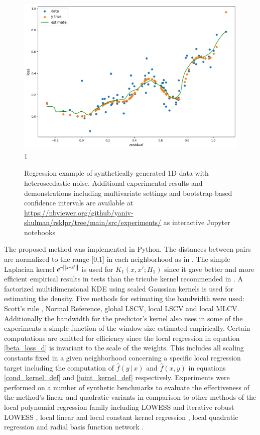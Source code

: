 \documentclass[preprint,1p,times]{elsarticle}
\begin{document}
\begin{figure}[t]
\caption{Regression example of synthetically generated 1D data with heteroscedastic noise. Additional experimental results and demonstrations including multivariate settings and bootstrap based confidence intervals are available at \url{https://nbviewer.org/github/yaniv-shulman/rsklpr/tree/main/src/experiments/} as interactive Jupyter notebooks \cite{jupyter}}
\centering
\includegraphics[width=1.0\textwidth]{example_regression_1d_1.png}1
\end{figure}

The proposed method was implemented in Python. The distances between pairs are normalized to the range [0,1] in each neighborhood as in \citep{clevland79}. The simple Laplacian kernel $e^{- \, \norm{x-x'}}$ is used for $K_1(x,x';H_1)$ since it gave better and more efficient empirical results in tests than the tricube kernel recommended in \citep{clevland79}. A factorized multidimensional KDE using scaled Gaussian kernels is used for estimating the density. Five methods for estimating the bandwidth were used: Scott's rule \cite{scott2015multivariate}, Normal Reference, global LSCV,  local LSCV and local MLCV. Additionally the bandwidth for the predictor's kernel also uses in some of the experiments a simple function of the window size estimated empirically. Certain computations are omitted for efficiency since the local regression in equation \eqref{beta_loss_d} is invariant to the scale of the weights. This includes all scaling constants fixed in a given neighborhood concerning a specific local regression target including the computation of $\hat{f}(y \, | \, x)$ and $\hat{f}(x,y)$ in equations \eqref{cond_kernel_def} and \eqref{joint_kernel_def} respectively. Experiments were performed on a number of synthetic benchmarks to evaluate the effectiveness of the method's linear and quadratic variants in comparison to other methods of the local polynomial regression family including LOWESS and iterative robust LOWESS \cite{seabold2010statsmodels}, local linear and local constant kernel regression \cite{seabold2010statsmodels}, local quadratic regression \cite{localreg} and radial basis function network \cite{localreg}. \newline
\end{document}

